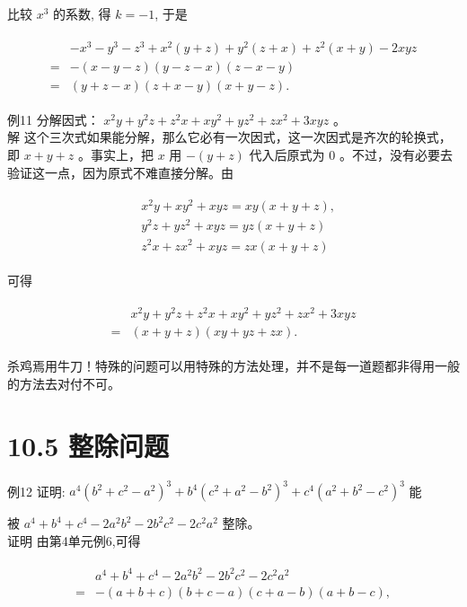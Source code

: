 \documentclass[10pt]{article}
\begin{document}
比较 $x^{3}$ 的系数, 得 $k=-1$, 于是

\begin{align*}
\begin{aligned}
& -x^{3}-y^{3}-z^{3}+x^{2}(y+z)+y^{2}(z+x)+z^{2}(x+y)-2 x y z \\
= & -(x-y-z)(y-z-x)(z-x-y) \\
= & (y+z-x)(z+x-y)(x+y-z) .
\end{aligned}
\end{align*}

例11 分解因式： $x^{2} y+y^{2} z+z^{2} x+x y^{2}+y z^{2}+z x^{2}+3 x y z$ 。\\
解 这个三次式如果能分解，那么它必有一次因式，这一次因式是齐次的轮换式，即 $x+y+z$ 。事实上，把 $x$ 用 $-(y+z)$ 代入后原式为 0 。不过，没有必要去验证这一点，因为原式不难直接分解。由

\begin{align*}
\begin{aligned}
& x^{2} y+x y^{2}+x y z=x y(x+y+z), \\
& y^{2} z+y z^{2}+x y z=y z(x+y+z) \\
& z^{2} x+z x^{2}+x y z=z x(x+y+z)
\end{aligned}
\end{align*}

可得

\begin{align*}
\begin{aligned}
& x^{2} y+y^{2} z+z^{2} x+x y^{2}+y z^{2}+z x^{2}+3 x y z \\
= & (x+y+z)(x y+y z+z x) .
\end{aligned}
\end{align*}

杀鸡焉用牛刀！特殊的问题可以用特殊的方法处理，并不是每一道题都非得用一般的方法去对付不可。

\section*{10.5 整除问题}
例12 证明: $a^{4}\left(b^{2}+c^{2}-a^{2}\right)^{3}+b^{4}\left(c^{2}+a^{2}-b^{2}\right)^{3}+c^{4}\left(a^{2}+b^{2}-c^{2}\right)^{3}$ 能

被 $a^{4}+b^{4}+c^{4}-2 a^{2} b^{2}-2 b^{2} c^{2}-2 c^{2} a^{2}$ 整除。\\
证明 由第4单元例6,可得

\begin{align*}
\begin{aligned}
& a^{4}+b^{4}+c^{4}-2 a^{2} b^{2}-2 b^{2} c^{2}-2 c^{2} a^{2} \\
= & -(a+b+c)(b+c-a)(c+a-b)(a+b-c),
\end{aligned}
\end{align*}
\end{document}
